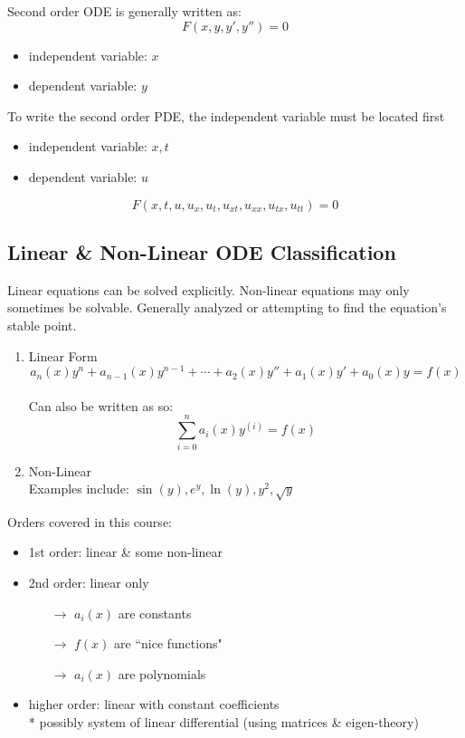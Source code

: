 \documentclass{article}
\begin{document}
Second order ODE is generally written as:
$$ F \left( x, y, y', y'' \right) = 0 $$
\begin{itemize}
    \item independent variable: $x$
    \item dependent variable: $y$
\end{itemize}

To write the second order PDE, the independent variable must be located first
\begin{itemize}
    \item independent variable: $x, t$
    \item dependent variable: $u$
\end{itemize}
$$ F \left( x, t, u, u_{x}, u_{t}, u_{xt}, u_{xx}, u_{tx}, u_{tt} \right) = 0 $$

\subsection{Linear \& Non-Linear ODE Classification}

Linear equations can be solved explicitly.
Non-linear equations may only sometimes be solvable. Generally analyzed or attempting to find the equation's stable point.

\begin{enumerate}
    \item Linear Form
        $$ a_{n}(x) y^{n} + a_{n - 1}(x) y^{n-1} + \cdots + a_{2}(x) y'' + a_{1}(x) y' + a_{0}(x) y = f(x) $$ \\
        Can also be written as so:
        $$ \sum_{i = 0}^{n} a_{i}(x) y^{(i)} = f(x) $$

    \item Non-Linear \\
        Examples include: $ \sin(y), e^{y}, \ln(y), y^{2}, \sqrt{y} $
\end{enumerate}

Orders covered in this course:
\begin{itemize}
    \item 1st order: linear \& some non-linear

    \item 2nd order: linear only
        \begin{itemize}
            \item[$\rightarrow$] $ a_{i}(x) $ are constants
            \item[$\rightarrow$] $ f(x) $ are ``nice functions"
            \item[$\rightarrow$] $ a_{i}(x) $ are polynomials
        \end{itemize}

    \item higher order: linear with constant coefficients \\
        * possibly system of linear differential (using matrices \& eigen-theory)
\end{itemize}
\end{document}
